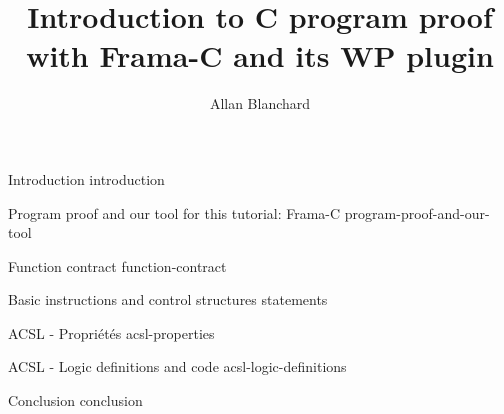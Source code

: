 \documentclass[middle]{zmdocument}
\title{Introduction to C program proof with Frama-C and its WP plugin}
\author{Allan Blanchard}
\begin{document}
\maketitle
\tableofcontents

\begin{levelOne}
  {Introduction}
  {introduction}
\end{levelOne}

\begin{levelOne}
  {Program proof and our tool for this tutorial: Frama-C}
  {program-proof-and-our-tool}
\end{levelOne}

\begin{levelOne}
  {Function contract}
  {function-contract}
\end{levelOne}

\begin{levelOne}
  {Basic instructions and control structures}
  {statements}
\end{levelOne}

\begin{levelOne}
  {ACSL - Propriétés}
  {acsl-properties}
\end{levelOne}


\begin{levelOne}
  {ACSL - Logic definitions and code}
  {acsl-logic-definitions}
\end{levelOne}


\begin{levelOne}
  {Conclusion}
  {conclusion}
\end{levelOne}
\end{document}
